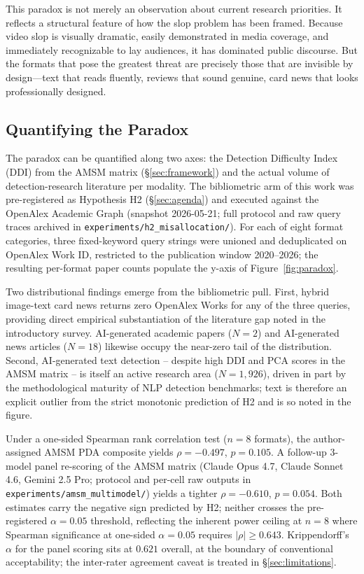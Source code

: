 \documentclass[12pt,a4paper]{article}
\begin{document}
This paradox is not merely an observation about current research priorities. It reflects a structural feature of how the slop problem has been framed. Because video slop is visually dramatic, easily demonstrated in media coverage, and immediately recognizable to lay audiences, it has dominated public discourse. But the formats that pose the greatest threat are precisely those that are invisible by design---text that reads fluently, reviews that sound genuine, card news that looks professionally designed.

\subsection{Quantifying the Paradox}

The paradox can be quantified along two axes: the Detection Difficulty Index (DDI) from the AMSM matrix (\S\ref{sec:framework}) and the actual volume of detection-research literature per modality. The bibliometric arm of this work was pre-registered as Hypothesis H2 (\S\ref{sec:agenda}) and executed against the OpenAlex Academic Graph (snapshot 2026-05-21; full protocol and raw query traces archived in \texttt{experiments/h2\_misallocation/}). For each of eight format categories, three fixed-keyword query strings were unioned and deduplicated on OpenAlex Work ID, restricted to the publication window 2020--2026; the resulting per-format paper counts populate the y-axis of Figure~\ref{fig:paradox}.

Two distributional findings emerge from the bibliometric pull. First, hybrid image-text card news returns zero OpenAlex Works for any of the three queries, providing direct empirical substantiation of the literature gap noted in the introductory survey. AI-generated academic papers ($N=2$) and AI-generated news articles ($N=18$) likewise occupy the near-zero tail of the distribution. Second, AI-generated text detection -- despite high DDI and PCA scores in the AMSM matrix -- is itself an active research area ($N=1{,}926$), driven in part by the methodological maturity of NLP detection benchmarks; text is therefore an explicit outlier from the strict monotonic prediction of H2 and is so noted in the figure.

Under a one-sided Spearman rank correlation test ($n=8$ formats), the author-assigned AMSM PDA composite yields $\rho = -0.497$, $p = 0.105$. A follow-up 3-model panel re-scoring of the AMSM matrix (Claude Opus 4.7, Claude Sonnet 4.6, Gemini 2.5 Pro; protocol and per-cell raw outputs in \texttt{experiments/amsm\_multimodel/}) yields a tighter $\rho = -0.610$, $p = 0.054$. Both estimates carry the negative sign predicted by H2; neither crosses the pre-registered $\alpha = 0.05$ threshold, reflecting the inherent power ceiling at $n=8$ where Spearman significance at one-sided $\alpha = 0.05$ requires $|\rho| \ge 0.643$. Krippendorff's $\alpha$ for the panel scoring sits at $0.621$ overall, at the boundary of conventional acceptability; the inter-rater agreement caveat is treated in \S\ref{sec:limitations}.
\end{document}
